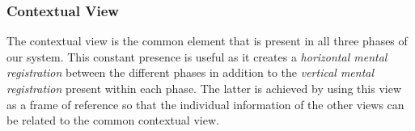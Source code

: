 \documentclass{vgtc}                          %
\begin{document}
%

\subsubsection{Contextual View}\label{sec:overview:planning:3d}
The contextual view is the common element that is present in all three phases of our system. This constant presence is useful as it creates a \emph{horizontal mental registration} between the different phases in addition to the \emph{vertical mental registration} present within each phase. The latter is achieved by using this view as a frame of reference so that the individual information of the other views can be related to the common contextual view.
\end{document}
